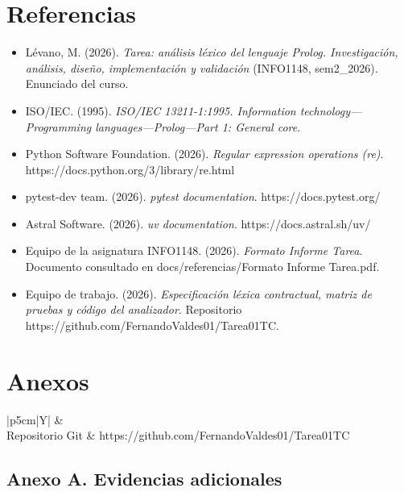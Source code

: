 \documentclass[11pt,letterpaper]{article}
\newcommand{\code}[1]{{\ttfamily\small #1}}
\begin{document}
\section{Referencias}

\begin{itemize}
  \item Lévano, M. (2026). \textit{Tarea: análisis léxico del lenguaje Prolog. Investigación, análisis, diseño, implementación y validación} (INFO1148, sem2\_2026). Enunciado del curso.
  \item ISO/IEC. (1995). \textit{ISO/IEC 13211-1:1995. Information technology---Programming languages---Prolog---Part 1: General core}.
  \item Python Software Foundation. (2026). \textit{Regular expression operations (re)}. https://docs.python.org/3/library/re.html
  \item pytest-dev team. (2026). \textit{pytest documentation}. https://docs.pytest.org/
  \item Astral Software. (2026). \textit{uv documentation}. https://docs.astral.sh/uv/
  \item Equipo de la asignatura INFO1148. (2026). \textit{Formato Informe Tarea}. Documento consultado en \code{docs/referencias/\allowbreak Formato Informe Tarea.pdf}.
  \item Equipo de trabajo. (2026). \textit{Especificación léxica contractual, matriz de pruebas y código del analizador}. Repositorio https://github.com/FernandoValdes01/Tarea01TC.
\end{itemize}

\section{Anexos}

\noindent
\begin{tabularx}{\textwidth}{|p{5cm}|Y|}
  \hline
   &  \\
  \hline
  Repositorio Git & https://github.com/FernandoValdes01/Tarea01TC \\
  \hline
\end{tabularx}

\subsection{Anexo A. Evidencias adicionales}
\end{document}
